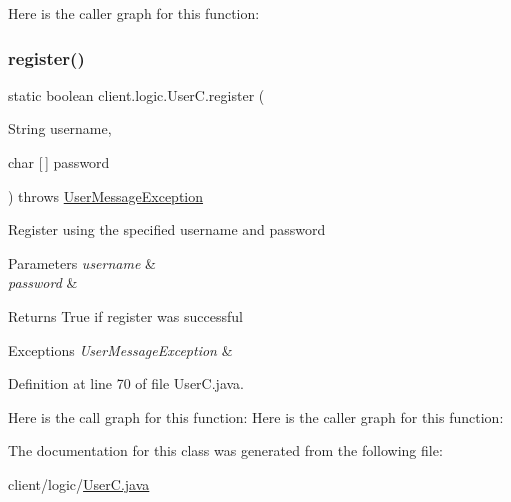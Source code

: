 Here is the caller graph for this function\+:
\hypertarget{classclient_1_1logic_1_1_user_c_a81ee75a5f1f4a278a71054a9c4f72609}{}\label{classclient_1_1logic_1_1_user_c_a81ee75a5f1f4a278a71054a9c4f72609} 
\subsubsection{\texorpdfstring{register()}{register()}}
{\footnotesize\ttfamily static boolean client.\+logic.\+User\+C.\+register (\begin{DoxyParamCaption}\item[{String}]{username,  }\item[{char \mbox{[}$\,$\mbox{]}}]{password }\end{DoxyParamCaption}) throws \hyperlink{classpt_1_1up_1_1fe_1_1lpro1613_1_1sharedlib_1_1exceptions_1_1_user_message_exception}{User\+Message\+Exception}\hspace{0.3cm}{\ttfamily [static]}}

Register using the specified username and password


\begin{DoxyParams}{Parameters}
{\em username} & \\
\hline
{\em password} & \\
\hline
\end{DoxyParams}
\begin{DoxyReturn}{Returns}
True if register was successful 
\end{DoxyReturn}

\begin{DoxyExceptions}{Exceptions}
{\em User\+Message\+Exception} & \\
\hline
\end{DoxyExceptions}


Definition at line 70 of file User\+C.\+java.

Here is the call graph for this function\+:
Here is the caller graph for this function\+:


The documentation for this class was generated from the following file\+:\begin{DoxyCompactItemize}
\item 
client/logic/\hyperlink{_user_c_8java}{User\+C.\+java}\end{DoxyCompactItemize}
